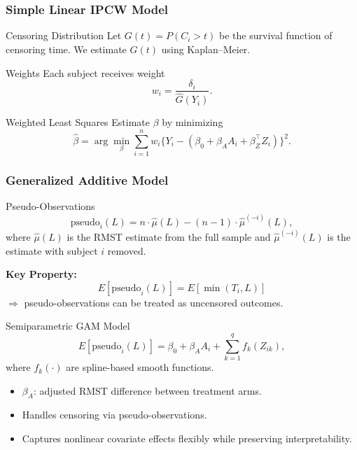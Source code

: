 \documentclass{beamer}
\begin{document}
\begin{frame}
\frametitle{Simple Linear IPCW Model \citep{zhao2001}}

\begin{block}{Censoring Distribution}
Let $G(t) = P(C_i > t)$ be the survival function of censoring time.  
We estimate $\widehat{G}(t)$ using Kaplan–Meier.
\end{block}

\begin{block}{Weights}
Each subject receives weight
\[
w_i = \frac{\delta_i}{\widehat{G}(Y_i)}.
\]
\end{block}

\begin{block}{Weighted Least Squares}
Estimate $\beta$ by minimizing
\[
\widehat{\beta} = \arg\min_\beta \sum_{i=1}^n w_i \Big\{ Y_i - (\beta_0 + \beta_A A_i + \beta_Z^\top Z_i)\Big\}^2.
\]
\end{block}

\end{frame}

\begin{frame}
\frametitle{Generalized Additive Model \citep{parner2010}}

\begin{block}{Pseudo-Observations}
\[
\text{pseudo}_i(L) = n \cdot \widehat{\mu}(L) - (n-1)\cdot \widehat{\mu}^{(-i)}(L),
\]
\scriptsize
where $\widehat{\mu}(L)$ is the RMST estimate from the full sample and  
$\widehat{\mu}^{(-i)}(L)$ is the estimate with subject $i$ removed.  

\textbf{Key Property:}  
\[
E[\text{pseudo}_i(L)] = E[\min(T_i,L)]
\]
$\Rightarrow$ pseudo-observations can be treated as uncensored outcomes.
\end{block}

\begin{block}{Semiparametric GAM Model}
\[
E[\text{pseudo}_i(L)] = \beta_0 + \beta_A A_i + \sum_{k=1}^q f_k(Z_{ik}),
\]
\scriptsize
where $f_k(\cdot)$ are spline-based smooth functions.

\begin{itemize}
  \item $\beta_A$: adjusted RMST difference between treatment arms.  
  \item Handles censoring via pseudo-observations.  
  \item Captures nonlinear covariate effects flexibly while preserving interpretability.  
\end{itemize}
\end{block}

\end{frame}
\end{document}
